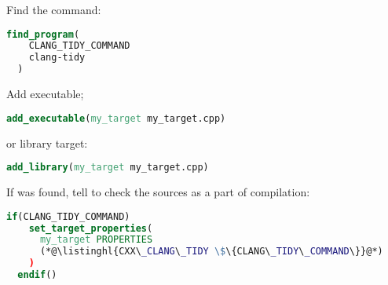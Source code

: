\documentclass[compress,table,xcolor=table]{beamer}
\begin{document}
\begin{frame}[fragile]
  \Large
  Find the  command:
  \begin{lstlisting}[language=cmake]
  find_program(
    CLANG_TIDY_COMMAND
    clang-tidy
  )
  \end{lstlisting}

  Add executable;
  \begin{lstlisting}[language=cmake]
  add_executable(my_target my_target.cpp)
  \end{lstlisting}

  or library target:
  \begin{lstlisting}[language=cmake]
  add_library(my_target my_target.cpp)
  \end{lstlisting}
\end{frame}
\begin{frame}[fragile]
  \Large
  If  was found, tell  to check the sources
  as a part of compilation:
  \begin{lstlisting}[language=cmake]
  if(CLANG_TIDY_COMMAND)
    set_target_properties(
      my_target PROPERTIES
      (*@\listinghl{CXX\_CLANG\_TIDY \$\{CLANG\_TIDY\_COMMAND\}}@*)
    )
  endif()
  \end{lstlisting}
\end{frame}
\end{document}
